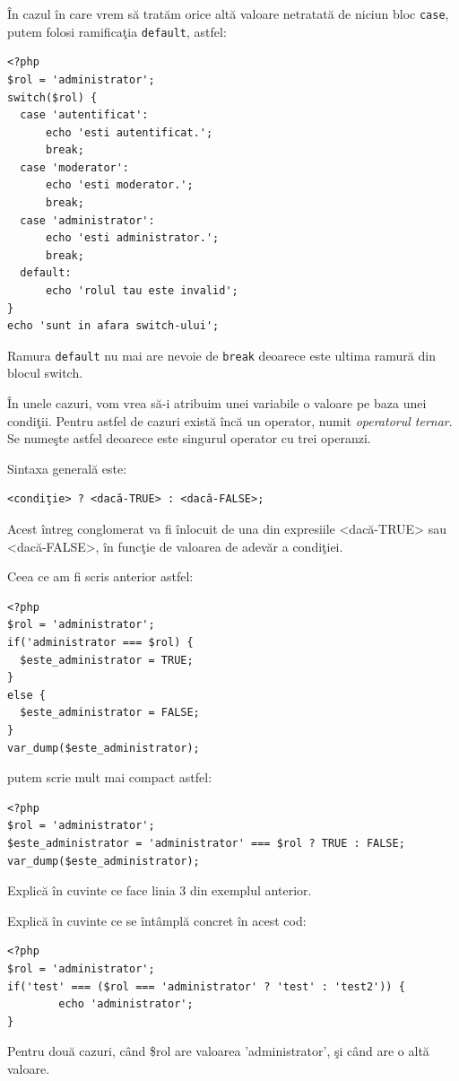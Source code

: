 În cazul în care vrem să tratăm orice altă
valoare netratată de niciun bloc \texttt{case}, putem
folosi ramificaţia \texttt{default}, astfel:

\begin{lstlisting}
<?php
$rol = 'administrator';
switch($rol) {
  case 'autentificat':
	  echo 'esti autentificat.';
	  break;
  case 'moderator':
	  echo 'esti moderator.';
	  break;
  case 'administrator':
	  echo 'esti administrator.';
	  break;
  default:
	  echo 'rolul tau este invalid';
}
echo 'sunt in afara switch-ului';
\end{lstlisting}
Ramura \texttt{default} nu mai are nevoie de \texttt{break} deoarece
este ultima ramură din blocul switch.


În unele cazuri, vom vrea să-i atribuim unei variabile o valoare
pe baza unei condiţii. Pentru astfel de cazuri există încă un
operator, numit \textsl{operatorul ternar}. Se numeşte astfel deoarece
este singurul operator cu trei operanzi.

Sintaxa generală este:
\begin{verbatim}
<condiţie> ? <dacă-TRUE> : <dacă-FALSE>;
\end{verbatim}
Acest întreg {\glqq}conglomerat{\grqq} va fi înlocuit de
una din expresiile <dacă-TRUE> sau <dacă-FALSE>,
în funcţie de valoarea de adevăr a condiţiei.


Ceea ce am fi scris anterior astfel:
\begin{lstlisting}
<?php
$rol = 'administrator';
if('administrator === $rol) {
  $este_administrator = TRUE;
}
else {
  $este_administrator = FALSE;
}
var_dump($este_administrator);
\end{lstlisting}
putem scrie mult mai compact astfel:
\begin{lstlisting}
<?php
$rol = 'administrator';
$este_administrator = 'administrator' === $rol ? TRUE : FALSE;
var_dump($este_administrator);
\end{lstlisting}
\begin{Exercise}[title={Înţelegerea operatorului ternar},difficulty=2]
\ExePart
Explică în cuvinte ce face linia 3 din exemplul anterior.

\ExePart
Explică în cuvinte ce se întâmplă concret în acest cod:
\begin{lstlisting}
<?php
$rol = 'administrator';
if('test' === ($rol === 'administrator' ? 'test' : 'test2')) {
        echo 'administrator';
}
\end{lstlisting}
Pentru două cazuri, când \$rol are valoarea 'administrator', şi când
are o altă valoare.
\end{Exercise}

